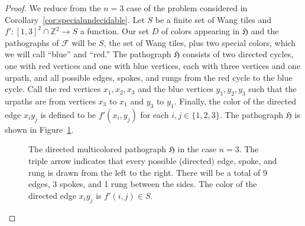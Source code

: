 \documentclass{article}
\newcommand{\aclabvert}[5]{\node[cdot={#5}, label={[label distance=-2pt] #4:{$#3$}}] (#1) at (#2) {};}
\newcommand{\dicoledge}[3]{\draw[->, shorten >=4pt, color=#3] (#1) -- (#2);}
\newcommand{\dicolurpath}[3]{\draw[->, decorate, decoration={snake, amplitude=1.5, segment length=10, post length=1mm, pre length=0}, shorten >=4pt, color=#3] (#1) -- (#2);}
\newcommand{\Fc}{\mathcal{F}}
\newcommand{\Hf}{\mathfrak{H}}
\newcommand{\Z}{\mathbb{Z}}
\begin{document}
\begin{proof}
We reduce from the $n=3$ case of the problem considered in Corollary~\ref{cor:specialundecidable}. Let $S$ be a finite set of Wang tiles and $f':[1,3]^2\cap \Z^2 \to S$ a function. Our set $D$ of colors appearing in $\Hf$ and the pathographs of $\Fc$ will be $S$, the set of Wang tiles, plus two special colors, which we will call ``blue'' and ``red.'' The pathograph $\Hf$ consists of two directed cycles, one with red vertices and one with blue vertices, each with three vertices and one urpath, and all possible edges, spokes, and rungs from the red cycle to the blue cycle. Call the red vertices $x_1,x_2,x_3$ and the blue vertices $y_1,y_2,y_3$ such that the urpaths are from vertices $x_3$ to $x_1$ and $y_3$ to $y_1$. Finally, the color of the directed edge $x_iy_j$ is defined to be $f'(x_i,y_j)$ for each $i,j\in\{1,2,3\}$. The pathograph $\Hf$ is shown in Figure~\ref{fig:dimultiH}.

\begin{figure}[htbp!]
    \centering
    \caption{The directed multicolored pathograph $\Hf$ in the case $n=3$. The triple arrow indicates that every possible (directed) edge, spoke, and rung is drawn from the left to the right. There will be a total of 9 edges, 3 spokes, and 1 rung between the sides. The color of the directed edge $x_iy_j$ is $f'(i,j)\in S$.}
    \label{fig:dimultiH}
\end{figure}


\end{proof}
\end{document}
